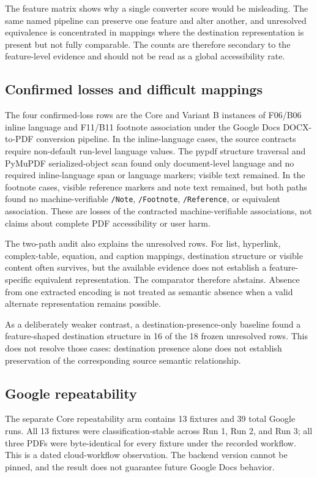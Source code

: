 The feature matrix shows why a single converter score would be misleading. The same named pipeline can preserve one feature and alter another, and unresolved equivalence is concentrated in mappings where the destination representation is present but not fully comparable. The counts are therefore secondary to the feature-level evidence and should not be read as a global accessibility rate.

\subsection{Confirmed losses and difficult mappings}

The four confirmed-loss rows are the Core and Variant B instances of F06/B06 inline language and F11/B11 footnote association under the Google Docs DOCX-to-PDF conversion pipeline. In the inline-language cases, the source contracts require non-default run-level language values. The pypdf structure traversal and PyMuPDF serialized-object scan found only document-level language and no required inline-language span or language markers; visible text remained. In the footnote cases, visible reference markers and note text remained, but both paths found no machine-verifiable \texttt{/Note}, \texttt{/Footnote}, \texttt{/Reference}, or equivalent association. These are losses of the contracted machine-verifiable associations, not claims about complete PDF accessibility or user harm.

The two-path audit also explains the unresolved rows. For list, hyperlink, complex-table, equation, and caption mappings, destination structure or visible content often survives, but the available evidence does not establish a feature-specific equivalent representation. The comparator therefore abstains. Absence from one extracted encoding is not treated as semantic absence when a valid alternate representation remains possible.

As a deliberately weaker contrast, a destination-presence-only baseline found a feature-shaped destination structure in 16 of the 18 frozen unresolved rows. This does not resolve those cases: destination presence alone does not establish preservation of the corresponding source semantic relationship.

\subsection{Google repeatability}

The separate Core repeatability arm contains 13 fixtures and 39 total Google runs. All 13 fixtures were classification-stable across Run 1, Run 2, and Run 3; all three PDFs were byte-identical for every fixture under the recorded workflow. This is a dated cloud-workflow observation. The backend version cannot be pinned, and the result does not guarantee future Google Docs behavior.

